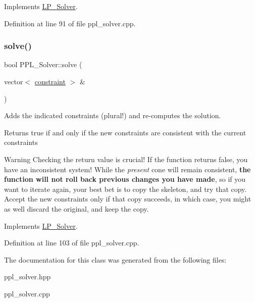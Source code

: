Implements \hyperlink{class_l_p___solver_abd84374c52124116becc8924dc74e12d}{L\+P\+\_\+\+Solver}.



Definition at line 91 of file ppl\+\_\+solver.\+cpp.

\mbox{\label{class_p_p_l___solver_a5000b8c5bee37029276ce63a3568bfb7}} 
\subsubsection{\texorpdfstring{solve()}{solve()}\hspace{0.1cm}{\footnotesize\ttfamily [2/2]}}
{\footnotesize\ttfamily bool P\+P\+L\+\_\+\+Solver\+::solve (\begin{DoxyParamCaption}\item[{vector$<$ \hyperlink{classconstraint}{constraint} $>$ \&}]{ }\end{DoxyParamCaption})\hspace{0.3cm}{\ttfamily [virtual]}}



Adds the indicated constraints (plural!) and re-\/computes the solution. 

\begin{DoxyReturn}{Returns}
{\ttfamily true} if and only if the new constraints are consistent with the current constraints
\end{DoxyReturn}
\begin{DoxyWarning}{Warning}
Checking the return value is crucial! If the function returns {\ttfamily false}, you have an inconsistent system! While the {\itshape present} cone will remain consistent, {\bfseries the function will not roll back previous changes you have made}, so if you want to iterate again, your best bet is to copy the skeleton, and try that copy. Accept the new constraints only if that copy succeeds, in which case, you might as well discard the original, and keep the copy. 
\end{DoxyWarning}


Implements \hyperlink{class_l_p___solver_a35da4bdf5db971c445f495b6eaab072d}{L\+P\+\_\+\+Solver}.



Definition at line 103 of file ppl\+\_\+solver.\+cpp.



The documentation for this class was generated from the following files\+:\begin{DoxyCompactItemize}
\item 
ppl\+\_\+solver.\+hpp\item 
ppl\+\_\+solver.\+cpp\end{DoxyCompactItemize}
